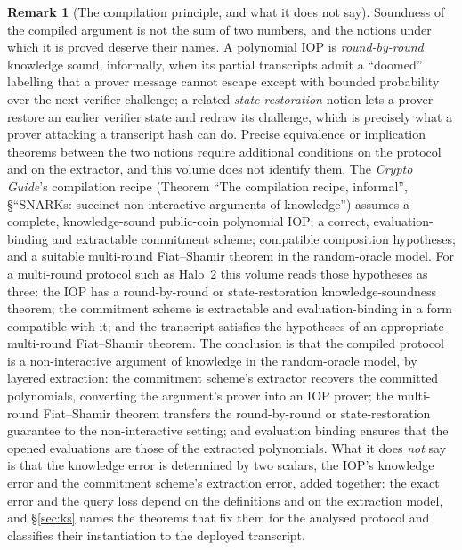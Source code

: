 \documentclass[11pt,a4paper]{article}
\theoremstyle{definition}
\newtheorem{remark}[theorem]{Remark}
\begin{document}
\begin{remark}[The compilation principle, and what it does not say]
\label{rem:halo2-compile}
Soundness of the compiled argument is not the sum of two numbers, and
the notions under which it is proved deserve their names. A polynomial
IOP is \emph{round-by-round} knowledge sound, informally, when its
partial transcripts admit a ``doomed'' labelling that a prover message
cannot escape except with bounded probability over the next verifier
challenge; a related \emph{state-restoration} notion lets a prover
restore an earlier verifier state and redraw its challenge, which is
precisely what a prover attacking a transcript hash can do. Precise
equivalence or implication theorems between the two notions require
additional conditions on the protocol and on the extractor, and this
volume does not identify them. The \emph{Crypto Guide}'s compilation
recipe (Theorem ``The compilation recipe, informal'', \S``SNARKs:
succinct non-interactive arguments of knowledge'') assumes a complete,
knowledge-sound public-coin polynomial IOP; a correct,
evaluation-binding and extractable commitment scheme; compatible
composition hypotheses; and a suitable multi-round Fiat--Shamir theorem
in the random-oracle model. For a multi-round protocol such as Halo~2
this volume reads those hypotheses as three: the IOP has a
round-by-round or state-restoration knowledge-soundness theorem; the
commitment scheme is extractable and evaluation-binding in a form
compatible with it; and the transcript satisfies the hypotheses of an
appropriate multi-round Fiat--Shamir theorem. The conclusion is that the
compiled protocol is a non-interactive argument of knowledge in the
random-oracle model, by layered extraction: the commitment scheme's
extractor recovers the committed polynomials, converting the argument's
prover into an IOP prover; the multi-round Fiat--Shamir theorem
transfers the round-by-round or state-restoration guarantee to the
non-interactive setting; and evaluation binding ensures that the opened
evaluations are those of the extracted polynomials. What it does
\emph{not} say is that the knowledge error is determined by two scalars,
the IOP's knowledge error and the commitment scheme's extraction error,
added together: the exact error and the query loss depend on the
definitions and on the extraction model, and \S\ref{sec:ks} names the
theorems that fix them for the analysed protocol and classifies their
instantiation to the deployed transcript.
\end{remark}
\end{document}
